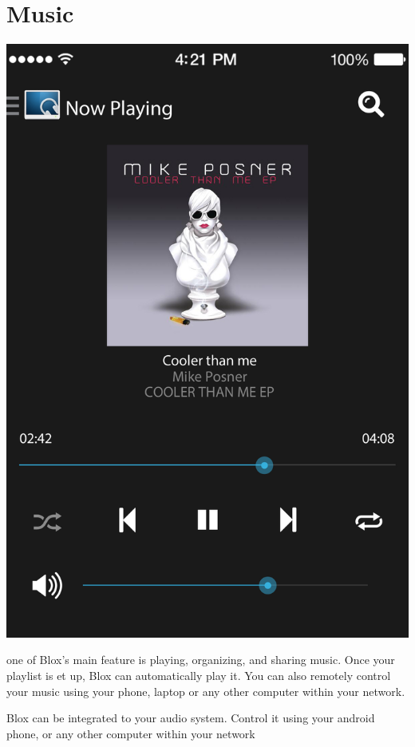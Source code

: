 \documentclass[letterpaper,10pt,english]{sphinxmanual}
\begin{document}
\chapter{Music}
\label{music:music}\label{music::doc}\label{music:id1}
\includegraphics{mpd.jpg}

one of Blox's main feature is playing, organizing, and sharing music. Once your playlist is et up, Blox can automatically play it. You can also remotely control your music using your phone, laptop or any other computer within your network.

Blox can be integrated to your audio system. Control it using your android phone, or any other computer within your network
\end{document}
